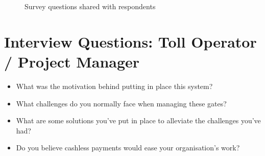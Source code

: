 \begin{appendices}
\begin{figure}[h]
        \caption{Survey questions shared with respondents}%
        \label{fig:interview questions}%
    \end{figure}

    \clearpage
    \section*{Interview Questions: Toll Operator / Project Manager}
    \begin{itemize}
        \item What was the motivation behind putting in place this system?
        \item What challenges do you normally face when managing these gates?
        \item What are some solutions you've put in place to alleviate the challenges you've had?
        \item Do you believe cashless payments would ease your organisation's work?
    \end{itemize}


\end{appendices}
